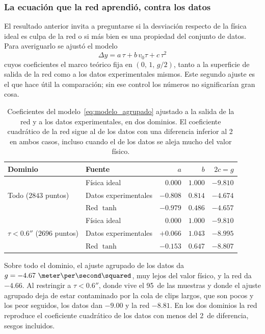 \documentclass[titlepage,11pt]{article}
\providecommand{\num}[1]{\ensuremath{#1}}
\providecommand{\SI}[2]{#1\,#2}
\providecommand{\percent}{\char37\relax}
\begin{document}
\subsubsection{La ecuación que la red aprendió, contra los datos}
\label{subsubsec:ecuacion}

El resultado anterior invita a preguntarse si la desviación respecto de la
física ideal es culpa de la red o si más bien es una propiedad del conjunto de
datos. Para averiguarlo se ajustó el modelo
\begin{equation}
  \Delta y = a\,\tau + b\,v_0\tau + c\,\tau^2
  \label{eq:modelo_agrupado}
\end{equation}
cuyos coeficientes el marco teórico fija en $(0,\,1,\,g/2)$, tanto a la superficie de
salida de la red como a los datos experimentales mismos. Este segundo ajuste es
el que hace útil la comparación; sin ese control los números no significarían
gran cosa.

\begin{table}
  \centering
  \begin{tabular}{llrrr}
    \toprule
    Dominio & Fuente & $a$ & $b$ & $2c = g$ \\
    \midrule
    \multirow{3}{*}{Todo ($\num{2843}$ puntos)}
      & Física ideal & $0.000$ & $1.000$ & $-9.810$ \\
      & Datos experimentales & $-0.808$ & $0.814$ & $-4.674$ \\
      & Red $\tanh$ & $-0.979$ & $0.486$ & $\mathbf{-4.657}$ \\
    \midrule
    \multirow{3}{*}{$\tau<\unit{0.6}{\second}$ ($\num{2696}$ puntos)}
      & Física ideal & $0.000$ & $1.000$ & $-9.810$ \\
      & Datos experimentales & $+0.066$ & $1.043$ & $-8.995$ \\
      & Red $\tanh$ & $-0.153$ & $0.647$ & $\mathbf{-8.807}$ \\
    \bottomrule
  \end{tabular}
  \caption{Coeficientes del modelo~\eqref{eq:modelo_agrupado} ajustado a la
    salida de la red y a los datos experimentales, en dos dominios. El
    coeficiente cuadrático de la red sigue al de los datos con una diferencia
    inferior al \SI{2}{\percent} en ambos casos, incluso cuando el de los datos
    se aleja mucho del valor físico.}
  \label{tab:ecuacion}
\end{table}

Sobre todo el dominio, el ajuste agrupado de los datos da
$g=\num{-4.67}~\meter\per\second\squared$, muy lejos del valor físico, y la red
da $\num{-4.66}$. Al restringir a $\tau<\unit{0.6}{\second}$, donde vive el
\SI{95}{\percent} de las muestras y donde el ajuste agrupado deja de estar
contaminado por la cola de clips largos, que son pocos y los peor seguidos, los
datos dan $\num{-9.00}$ y la red $\num{-8.81}$. En los dos dominios la red
reproduce el coeficiente cuadrático de los datos con menos del
\SI{2}{\percent} de diferencia, sesgos incluidos.
\end{document}

